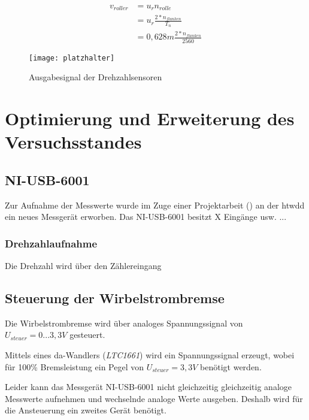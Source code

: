 \begin{equation} \label{eq: v-roller}
\begin{split}
v_{roller} & = u_r n_{rolle}  \\
 & = u_r \frac{2 * n_{flanken}}{T_n} \\
 & = 0,628m \frac{2 * n_{flanken}}{2560}
\end{split}
\end{equation}


\begin{figure}[!hbt]
\texttt{[image: platzhalter]}
\caption{Ausgabesignal der Drehzahlsensoren}
\label{fig: drehzahl-signal}
\end{figure}

\chapter{Optimierung und Erweiterung des Versuchsstandes}
\section{NI-USB-6001}
Zur Aufnahme der Messwerte wurde im Zuge einer Projektarbeit (\cite[][]{seiler}) an der \gls{htwdd}	ein neues Messgerät erworben. Das \textsc{NI-USB-6001} besitzt X Eingänge usw. ... \cite[][]{6001specs} \cite[][]{6001man}
\subsection{Drehzahlaufnahme}
Die Drehzahl wird über den Zählereingang 
\section{Steuerung der Wirbelstrombremse}
Die Wirbelstrombremse wird über analoges Spannungssignal von $U_{steuer} = 0 ... 3,3V$ gesteuert. 

Mittels eines \gls{da}-Wandlers (\emph{LTC1661}) wird ein Spannungssignal erzeugt, wobei für 100\% Bremsleistung ein Pegel von $U_{steuer} = 3,3V$ benötigt werden.
 
Leider kann das Messgerät \textsc{NI-USB-6001} nicht gleichzeitig gleichzeitig analoge Messwerte aufnehmen und wechselnde analoge Werte ausgeben. \cite[][]{6001-nomulti}
Deshalb wird für die Ansteuerung ein zweites Gerät benötigt.
